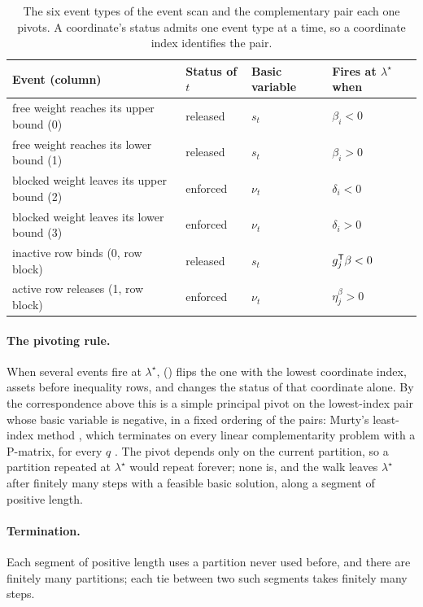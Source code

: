 \begin{table}[t]
\centering
\small
\begin{tabular}{llll}
\hline
Event (column) & Status of $t$ & Basic variable & Fires at $\lambda^{\star}$ when \\
\hline
free weight reaches its upper bound (0) & released & $s_t$ & $\beta_i < 0$ \\
free weight reaches its lower bound (1) & released & $s_t$ & $\beta_i > 0$ \\
blocked weight leaves its upper bound (2) & enforced & $\nu_t$ & $\delta_i < 0$ \\
blocked weight leaves its lower bound (3) & enforced & $\nu_t$ & $\delta_i > 0$ \\
inactive row binds (0, row block) & released & $s_t$ & $g_j^{\mathsf{T}}\beta < 0$ \\
active row releases (1, row block) & enforced & $\nu_t$ & $\eta^{\beta}_j > 0$ \\
\hline
\end{tabular}
\caption{The six event types of the event scan and the complementary pair each one
pivots. A coordinate's status admits one event type at a time, so a coordinate index
identifies the pair.}
\label{tab:pivots}
\end{table}

\paragraph{The pivoting rule.}
When several events fire at $\lambda^{\star}$, 
() flips the one with the lowest
coordinate index, assets before inequality rows, and changes the status of that
coordinate alone. By the correspondence above this is a simple principal pivot on the
lowest-index pair whose basic variable is negative, in a fixed ordering of the pairs:
Murty's least-index method \citep{murty1974}, which terminates on every linear
complementarity problem with a P-matrix, for every $q$ \citep{murty1974, cottle1992}.
The pivot depends only on the current partition, so a partition repeated at
$\lambda^{\star}$ would repeat forever; none is, and the walk leaves $\lambda^{\star}$ after
finitely many steps with a feasible basic solution, along a segment of positive length.

\paragraph{Termination.}
Each segment of positive length uses a partition never used before, and there are
finitely many partitions; each tie between two such segments takes finitely many steps.
